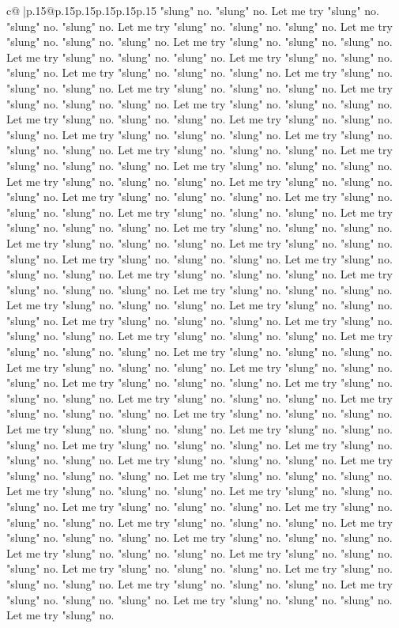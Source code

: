 \documentclass{article}
\begin{document}
{\begin{supertabular}{c@{$\;$}|p{.15\linewidth}@{}p{.15\linewidth}p{.15\linewidth}p{.15\linewidth}p{.15\linewidth}p{.15\linewidth}}
{{{"slung" no. "slung" no. Let me try "slung" no. "slung" no. "slung" no. Let me try "slung" no. "slung" no. "slung" no. Let me try "slung" no. "slung" no. "slung" no. Let me try "slung" no. "slung" no. "slung" no. Let me try "slung" no. "slung" no. "slung" no. Let me try "slung" no. "slung" no. "slung" no. Let me try "slung" no. "slung" no. "slung" no. Let me try "slung" no. "slung" no. "slung" no. Let me try "slung" no. "slung" no. "slung" no. Let me try "slung" no. "slung" no. "slung" no. Let me try "slung" no. "slung" no. "slung" no. Let me try "slung" no. "slung" no. "slung" no. Let me try "slung" no. "slung" no. "slung" no. Let me try "slung" no. "slung" no. "slung" no. Let me try "slung" no. "slung" no. "slung" no. Let me try "slung" no. "slung" no. "slung" no. Let me try "slung" no. "slung" no. "slung" no. Let me try "slung" no. "slung" no. "slung" no. Let me try "slung" no. "slung" no. "slung" no. Let me try "slung" no. "slung" no. "slung" no. Let me try "slung" no. "slung" no. "slung" no. Let me try "slung" no. "slung" no. "slung" no. Let me try "slung" no. "slung" no. "slung" no. Let me try "slung" no. "slung" no. "slung" no. Let me try "slung" no. "slung" no. "slung" no. Let me try "slung" no. "slung" no. "slung" no. Let me try "slung" no. "slung" no. "slung" no. Let me try "slung" no. "slung" no. "slung" no. Let me try "slung" no. "slung" no. "slung" no. Let me try "slung" no. "slung" no. "slung" no. Let me try "slung" no. "slung" no. "slung" no. Let me try "slung" no. "slung" no. "slung" no. Let me try "slung" no. "slung" no. "slung" no. Let me try "slung" no. "slung" no. "slung" no. Let me try "slung" no. "slung" no. "slung" no. Let me try "slung" no. "slung" no. "slung" no. Let me try "slung" no. "slung" no. "slung" no. Let me try "slung" no. "slung" no. "slung" no. Let me try "slung" no. "slung" no. "slung" no. Let me try "slung" no. "slung" no. "slung" no. Let me try "slung" no. "slung" no. "slung" no. Let me try "slung" no. "slung" no. "slung" no. Let me try "slung" no. "slung" no. "slung" no. Let me try "slung" no. "slung" no. "slung" no. Let me try "slung" no. "slung" no. "slung" no. Let me try "slung" no. "slung" no. "slung" no. Let me try "slung" no. "slung" no. "slung" no. Let me try "slung" no. "slung" no. "slung" no. Let me try "slung" no. "slung" no. "slung" no. Let me try "slung" no. "slung" no. "slung" no. Let me try "slung" no. "slung" no. "slung" no. Let me try "slung" no. "slung" no. "slung" no. Let me try "slung" no. "slung" no. "slung" no. Let me try "slung" no. "slung" no. "slung" no. Let me try "slung" no. "slung" no. "slung" no. Let me try "slung" no. "slung" no. "slung" no. Let me try "slung" no. "slung" no. "slung" no. Let me try "slung" no. "slung" no. "slung" no. Let me try "slung" no. "slung" no. "slung" no. Let me try "slung" no. "slung" no. "slung" no. Let me try "slung" no. "slung" no. "slung" no. Let me try "slung" no. "slung" no. "slung" no. Let me try "slung" no. "slung" no. "slung" no. Let me try "slung" no. "slung" no. "slung" no. Let me try "slung" no. "slung" no. "slung" no. Let me try "slung" no. "slung" no. "slung" no. Let me try "slung" no. "slung" no. "slung" no. Let me try "slung" no. }}}
\end{supertabular}}
\end{document}
